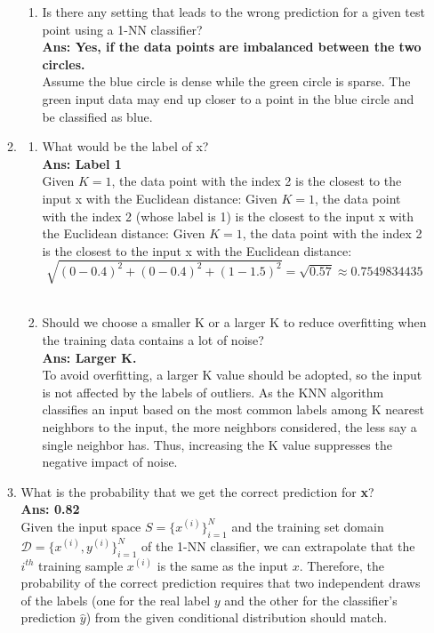 \documentclass{article}
\theoremstyle{definition}
\theoremstyle{remark}
\begin{document}
\begin{enumerate}[font={\Large\bfseries},left=0pt]
\begin{tcolorbox}
\begin{enumerate}
\begin{enumerate}
                \item Is there any setting that leads to the wrong prediction for a given test point using a 1-NN classifier?\\
\textbf{Ans: Yes, if the data points are imbalanced between the two circles.}\\
Assume the blue circle is dense while the green circle is sparse. The green input data may end up closer to a point in the blue circle and be classified as blue. \\
            \end{enumerate}
        \item 
            \begin{enumerate}
                \item What would be the label of x? \\
                \textbf{Ans: Label 1} \\
                Given $K = 1$, the data point with the index 2 is the closest to the input x with the Euclidean distance: 
                Given $K = 1$, the data point with the index 2 (whose label is 1) is the closest to the input x with the Euclidean distance: 
                Given $K = 1$, the data point with the index 2 is the closest to the input x with the Euclidean distance: 
                $$
                \sqrt{(0 - 0.4)^2 + (0 - 0.4)^2 + (1 - 1.5)^2} = \sqrt{0.57} \approx 0.7549834435
                $$ \\
                \item Should we choose a smaller K or a larger K to reduce overfitting when the training data contains a lot of noise? \\
                \textbf{Ans: Larger K.} \\
                To avoid overfitting, a larger K value should be adopted, so the input is not affected by the labels of outliers. As the KNN algorithm classifies an input based on the most common labels among K nearest neighbors to the input, the more neighbors considered, the less say a single neighbor has. Thus, increasing the K value suppresses the negative impact of noise.
            \end{enumerate}
        \item What is the probability that we get the correct prediction for \textbf{x}?\\
        \textbf{Ans: 0.82} \\
        Given the input space $S = \{x^{(i)}\}^N_{i=1}$ and the training set domain $\mathcal{D} = \{x^{(i)}, y^{(i)}\}^N_{i=1}$ of the 1-NN classifier, we can extrapolate that the $i^{th}$ training sample $x^{(i)}$ is the same as the input $x$. Therefore, the probability of the correct prediction requires that two independent draws of the labels (one for the real label $y$ and the other for the classifier's prediction $\hat{y}$) from the given conditional distribution should match. 

\end{enumerate}
\end{tcolorbox}
\end{enumerate}
\end{document}
